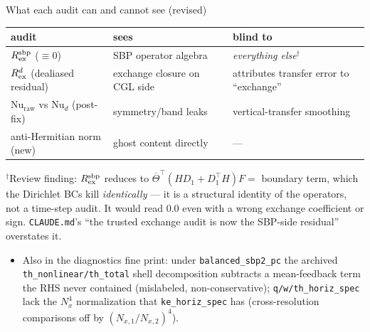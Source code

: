 \documentclass[aspectratio=169,10pt]{beamer}
\newcommand{\Tb}{\overline{\Theta}}
\newcommand{\file}[1]{\textcolor{blue!60!black}{\texttt{#1}}}
\newcommand{\Nud}{\mathrm{Nu}_{d}}
\newcommand{\Nuraw}{\mathrm{Nu}_{\mathrm{raw}}}
\begin{document}
\begin{frame}{What each audit can and cannot see (revised)}
  \begin{center}
  \small
  \begin{tabular}{@{}lll@{}}
    \toprule
    audit & sees & blind to \\
    \midrule
    $R_{\rm ex}^{\rm sbp}$ ($\equiv0$) & SBP operator algebra & \emph{everything else}$^{\dagger}$ \\
    $R_{\rm ex}^{d}$ (dealiased residual) & exchange closure on CGL side & attributes transfer error to ``exchange'' \\
    $\Nuraw$ vs $\Nud$ (post-fix) & symmetry/band leaks & vertical-transfer smoothing \\
    anti-Hermitian norm (new) & ghost content directly & --- \\
    \bottomrule
  \end{tabular}
  \end{center}
  {\footnotesize $^{\dagger}$Review finding: $R_{\rm ex}^{\rm sbp}$ reduces to
  $\Tb^{\top}(HD_1 + D_1^{\top}H)F = $ boundary term, which the Dirichlet BCs kill
  \emph{identically} --- it is a structural identity of the operators, not a
  time-step audit. It would read $0.0$ even with a wrong exchange coefficient or
  sign. \file{CLAUDE.md}'s ``the trusted exchange audit is now the SBP-side
  residual'' overstates it.}
  \begin{itemize}
    \item Also in the diagnostics fine print: under \texttt{balanced\_sbp2\_pc} the
      archived \texttt{th\_nonlinear/th\_total} shell decomposition subtracts a
      mean-feedback term the RHS never contained (mislabeled, non-conservative);
      \texttt{q/w/th\_horiz\_spec} lack the $N_x^4$ normalization that
      \texttt{ke\_horiz\_spec} has (cross-resolution comparisons off by
      $(N_{x,1}/N_{x,2})^4$).
  \end{itemize}
\end{frame}
\end{document}
